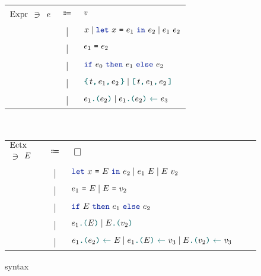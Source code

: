 \begin{figure}[tp]
  \begin{tabular}{rcl}
            $\datalangExpr[]$
            $\ni$
            $\datalangExpr$
            & $\Coloneqq$ &
            $\datalangVal$
        \\
            & | &
            $\datalangVar \mid \datalangLet{\datalangVar}{\datalangExpr_1}{\datalangExpr_2} \mid \datalangCall{\datalangExpr_1}{\datalangExpr_2}$
        \\
            & | &
            $\datalangEq{\datalangExpr_1}{\datalangExpr_2}$
        \\
            & | &
            $\datalangIf{\datalangExpr_0}{\datalangExpr_1}{\datalangExpr_2}$
        \\
            & | &
            $\datalangBlock{\datalangTag}{\datalangExpr_1}{\datalangExpr_2} \mid \datalangBlockDet{\datalangTag}{\datalangExpr_1}{\datalangExpr_2}$
        \\
            & | &
            $\datalangLoad{\datalangExpr_1}{\datalangExpr_2} \mid \datalangStore{\datalangExpr_1}{\datalangExpr_2}{\datalangExpr_3}$
  \end{tabular}~
  \begin{tabular}{lclcl}
            $\datalangEctx[]$
            $\ni$
            $\datalangEctx$
            & $\Coloneqq$ &
            $\Box$
        \\
            & | &
            $\datalangLet{\datalangVar}{\datalangEctx}{\datalangExpr_2} \mid \datalangCall{\datalangExpr_1}{\datalangEctx} \mid \datalangCall{\datalangEctx}{\datalangVal_2}$
        \\
            & | &
            $\datalangEq{\datalangExpr_1}{\datalangEctx} \mid \datalangEq{\datalangEctx}{\datalangVal_2}$
        \\
            & | &
            $\datalangIf{\datalangEctx}{\datalangExpr_1}{\datalangExpr_2}$
        \\
            & | &
            $\datalangLoad{\datalangExpr_1}{\datalangEctx} \mid \datalangLoad{\datalangEctx}{\datalangVal_2}$
        \\
            & | &
            $\datalangStore{\datalangExpr_1}{\datalangExpr_2}{\datalangEctx} \mid \datalangStore{\datalangExpr_1}{\datalangEctx}{\datalangVal_3} \mid \datalangStore{\datalangEctx}{\datalangVal_2}{\datalangVal_3}$
  \end{tabular}
    \caption{\DataLang syntax}
    \label{fig:syntax}
\end{figure}

